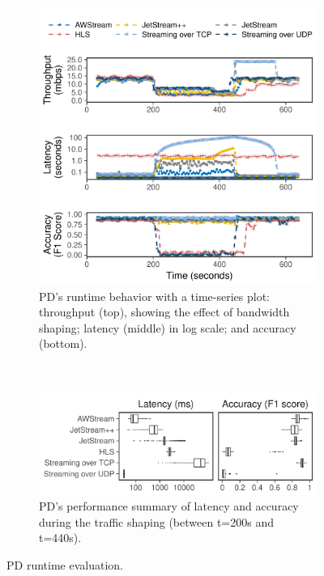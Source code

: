 \documentclass[twocolumn, 9pt]{article}
\begin{document}
\begin{figure}[t]
  \begin{subfigure}[t]{\columnwidth}
    \centering
    \includegraphics[width=\columnwidth]{figures/runtime_mot-timeseries.pdf}
    \caption{PD's runtime behavior with a time-series plot: throughput (top),
      showing the effect of bandwidth shaping; latency (middle) in log scale;
      and accuracy (bottom).}
    \label{fig:pd-runtime-timeseries}
  \end{subfigure}
  \vspace{1em}
  \\
  \begin{subfigure}[t]{\columnwidth}
    \centering
    \includegraphics[width=\columnwidth]{figures/runtime_mot-boxplot.pdf}
    \caption{PD's performance summary of latency and accuracy during the traffic
      shaping (between t=200s and t=440s).}
    \label{fig:pd-runtime-boxplot}
  \end{subfigure}
  \caption{PD runtime evaluation.}
  \label{fig:pd-runtime}
\end{figure}
\end{document}
